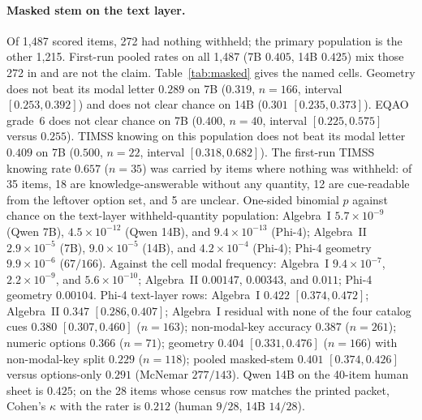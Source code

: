 \paragraph{Masked stem on the text layer.}
Of 1{,}487 scored items, 272 had nothing withheld; the primary population is the other 1{,}215. First-run pooled rates on all 1{,}487 (7B $0.405$, 14B $0.425$) mix those 272 in and are not the claim. Table~\ref{tab:masked} gives the named cells. Geometry does not beat its modal letter $0.289$ on 7B ($0.319$, $n=166$, interval $[0.253, 0.392]$) and does not clear chance on 14B ($0.301$ $[0.235, 0.373]$). EQAO grade~6 does not clear chance on 7B ($0.400$, $n=40$, interval $[0.225, 0.575]$ versus $0.255$). TIMSS knowing on this population does not beat its modal letter $0.409$ on 7B ($0.500$, $n=22$, interval $[0.318, 0.682]$). The first-run TIMSS knowing rate $0.657$ ($n=35$) was carried by items where nothing was withheld: of 35 items, 18 are knowledge-answerable without any quantity, 12 are cue-readable from the leftover option set, and 5 are unclear. One-sided binomial $p$ against chance on the text-layer withheld-quantity population: Algebra~I $5.7\times 10^{-9}$ (Qwen 7B), $4.5\times 10^{-12}$ (Qwen 14B), and $9.4\times 10^{-13}$ (Phi-4); Algebra~II $2.9\times 10^{-5}$ (7B), $9.0\times 10^{-5}$ (14B), and $4.2\times 10^{-4}$ (Phi-4); Phi-4 geometry $9.9\times 10^{-6}$ ($67/166$). Against the cell modal frequency: Algebra~I $9.4\times 10^{-7}$, $2.2\times 10^{-9}$, and $5.6\times 10^{-10}$; Algebra~II $0.00147$, $0.00343$, and $0.011$; Phi-4 geometry $0.00104$. Phi-4 text-layer rows: Algebra~I $0.422$ $[0.374, 0.472]$; Algebra~II $0.347$ $[0.286, 0.407]$; Algebra~I residual with none of the four catalog cues $0.380$ $[0.307, 0.460]$ ($n=163$); non-modal-key accuracy $0.387$ ($n=261$); numeric options $0.366$ ($n=71$); geometry $0.404$ $[0.331, 0.476]$ ($n=166$) with non-modal-key split $0.229$ ($n=118$); pooled masked-stem $0.401$ $[0.374, 0.426]$ versus options-only $0.291$ (McNemar $277/143$). Qwen 14B on the 40-item human sheet is $0.425$; on the 28 items whose census row matches the printed packet, Cohen's $\kappa$ with the rater is $0.212$ (human $9/28$, 14B $14/28$).

